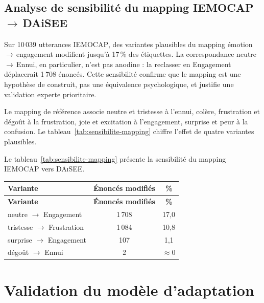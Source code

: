 \subsection{Analyse de sensibilité du mapping IEMOCAP\,$\rightarrow$\,DAiSEE}
\label{subsec:val-mapping}

Sur 10\,039 utterances \textsc{IEMOCAP}, des variantes plausibles du
mapping émotion\,$\rightarrow$\,engagement 
modifient jusqu'à 17\,\% des étiquettes. La correspondance
neutre\,$\rightarrow$\,Ennui, en particulier, n'est pas anodine : la
reclasser en Engagement déplacerait 1\,708 énoncés. Cette sensibilité
confirme que le mapping est une hypothèse de construit, pas une
équivalence psychologique, et justifie une validation experte prioritaire.

Le mapping de référence associe neutre et tristesse à l'ennui, colère,
frustration et dégoût à la frustration, joie et excitation à
l'engagement, surprise et peur à la confusion. Le
tableau~\ref{tab:sensibilite-mapping} chiffre l'effet de quatre
variantes plausibles.

Le tableau~\ref{tab:sensibilite-mapping} présente la sensibilité du mapping \textsc{IEMOCAP} vers \textsc{DAiSEE}.

{\small
\renewcommand{\arraystretch}{1.18}
\setlength{\tabcolsep}{4pt}
\begin{xltabular}{\textwidth}{|>{\raggedright\arraybackslash}X|c|c|}
\hline
{}
\textbf{Variante} & \textbf{Énoncés modifiés} & \textbf{\%} \\
\hline
\endfirsthead
\hline
{}
\textbf{Variante} & \textbf{Énoncés modifiés} & \textbf{\%} \\
\hline
\endhead
\endfoot
\endlastfoot
neutre $\rightarrow$ Engagement & 1\,708 & 17{,}0 \\
\hline
tristesse $\rightarrow$ Frustration & 1\,084 & 10{,}8 \\
\hline
surprise $\rightarrow$ Engagement & 107 & 1{,}1 \\
\hline
dégoût $\rightarrow$ Ennui & 2 & $\approx 0$ \\
\hline
\end{xltabular}
\label{tab:sensibilite-mapping}
}

\section{Validation du modèle d'adaptation}
\label{sec:val-decision}

